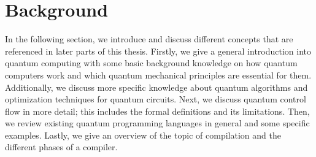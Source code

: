 \chapter{Background}
\label{ch:background}
In the following section, we introduce and discuss different concepts that are referenced in later parts of this thesis. Firstly, we give a general introduction into quantum computing with some basic background knowledge on how quantum computers work and which quantum mechanical principles are essential for them. Additionally, we discuss more specific knowledge about quantum algorithms and optimization techniques for quantum circuits. Next, we discuss quantum control flow in more detail; this includes the formal definitions and its limitations. Then, we review existing quantum programming languages in general and some specific examples. Lastly, we give an overview of the topic of compilation and the different phases of a compiler. 








